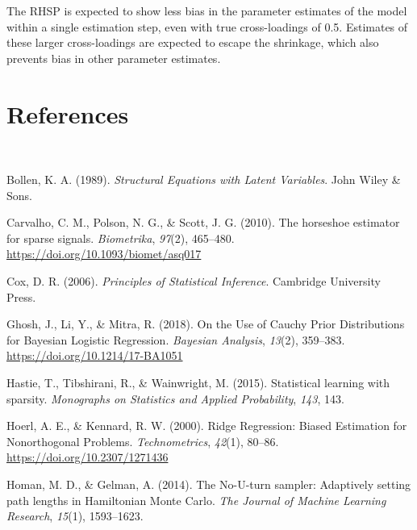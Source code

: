 \documentclass[
  man,floatsintext]{apa6}
\newlength{\cslhangindent}
\newlength{\cslentryspacingunit} %
\newenvironment{CSLReferences}[2] %
 {%
  \setlength{\parindent}{0pt}
  \ifodd #1
  \let\oldpar\par
  \def\par{\hangindent=\cslhangindent\oldpar}
  \fi
  \setlength{\parskip}{#2\cslentryspacingunit}
 }%
 {}
\begin{document}
The RHSP is expected to show less bias in the parameter estimates of the model within a single estimation step, even with true cross-loadings of 0.5. Estimates of these larger cross-loadings are expected to escape the shrinkage, which also prevents bias in other parameter estimates.

\clearpage

\hypertarget{references}{%
\section{References}\label{references}}

~

\begingroup
\setlength{\parindent}{-0.5in}
\setlength{\leftskip}{0.5in}

\hypertarget{refs}{}
\begin{CSLReferences}{1}{0}
\leavevmode{}%
Bollen, K. A. (1989). \emph{Structural {Equations} with {Latent} {Variables}}. John Wiley \& Sons.

\leavevmode{}%
Carvalho, C. M., Polson, N. G., \& Scott, J. G. (2010). The horseshoe estimator for sparse signals. \emph{Biometrika}, \emph{97}(2), 465--480. \url{https://doi.org/10.1093/biomet/asq017}

\leavevmode{}%
Cox, D. R. (2006). \emph{Principles of {Statistical} {Inference}}. Cambridge University Press.

\leavevmode{}%
Ghosh, J., Li, Y., \& Mitra, R. (2018). On the {Use} of {Cauchy} {Prior} {Distributions} for {Bayesian} {Logistic} {Regression}. \emph{Bayesian Analysis}, \emph{13}(2), 359--383. \url{https://doi.org/10.1214/17-BA1051}

\leavevmode{}%
Hastie, T., Tibshirani, R., \& Wainwright, M. (2015). Statistical learning with sparsity. \emph{Monographs on Statistics and Applied Probability}, \emph{143}, 143.

\leavevmode{}%
Hoerl, A. E., \& Kennard, R. W. (2000). Ridge {Regression}: {Biased} {Estimation} for {Nonorthogonal} {Problems}. \emph{Technometrics}, \emph{42}(1), 80--86. \url{https://doi.org/10.2307/1271436}

\leavevmode{}%
Homan, M. D., \& Gelman, A. (2014). The {No}-{U}-turn sampler: Adaptively setting path lengths in {Hamiltonian} {Monte} {Carlo}. \emph{The Journal of Machine Learning Research}, \emph{15}(1), 1593--1623.


\end{CSLReferences}
\end{document}
